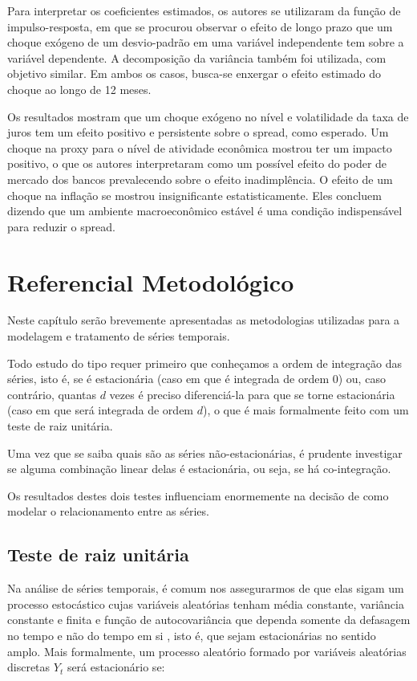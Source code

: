 \documentclass[a4paper,
               article,
               12pt,
               openany,
               oneside,
               english,
               brazil]{abntex2}
\numberwithin{equation}{section}
\begin{document}
    Para interpretar os coeficientes estimados, os autores se utilizaram da função de impulso-resposta, em que se procurou observar o efeito de longo prazo que um choque exógeno de um desvio-padrão em uma variável independente tem sobre a variável dependente. A decomposição da variância também foi utilizada, com objetivo similar. Em ambos os casos, busca-se enxergar o efeito estimado do choque ao longo de 12 meses.

    Os resultados mostram que um choque exógeno no nível e volatilidade da taxa de juros tem um efeito positivo e persistente sobre o spread, como esperado. Um choque na proxy para o nível de atividade econômica mostrou ter um impacto positivo, o que os autores interpretaram como um possível efeito do poder de mercado dos bancos prevalecendo sobre o efeito inadimplência. O efeito de um choque na inflação se mostrou insignificante estatisticamente. Eles concluem dizendo que um ambiente macroeconômico estável é uma condição indispensável para reduzir o spread.

\section{Referencial Metodológico}

    Neste capítulo serão brevemente apresentadas as metodologias utilizadas para a modelagem e tratamento de séries temporais.

    Todo estudo do tipo requer primeiro que conheçamos a ordem de integração das séries, isto é, se é estacionária (caso em que é integrada de ordem 0) ou, caso contrário, quantas $d$ vezes é preciso diferenciá-la para que se torne estacionária (caso em que será integrada de ordem $d$), o que é mais formalmente feito com um teste de raiz unitária.

    Uma vez que se saiba quais são as séries não-estacionárias, é prudente investigar se alguma combinação linear delas é estacionária, ou seja, se há co-integração.

    Os resultados destes dois testes influenciam enormemente na decisão de como modelar o relacionamento entre as séries. 

    \subsection{Teste de raiz unitária}

    Na análise de séries temporais, é comum nos assegurarmos de que elas sigam um processo estocástico cujas variáveis aleatórias tenham média constante, variância constante e finita e função de autocovariância que dependa somente da defasagem no tempo e não do tempo em si \cite[p.~734]{gujarati}, isto é, que sejam estacionárias no sentido amplo. Mais formalmente, um processo aleatório formado por variáveis aleatórias discretas $Y_t$ será estacionário se:
\end{document}

